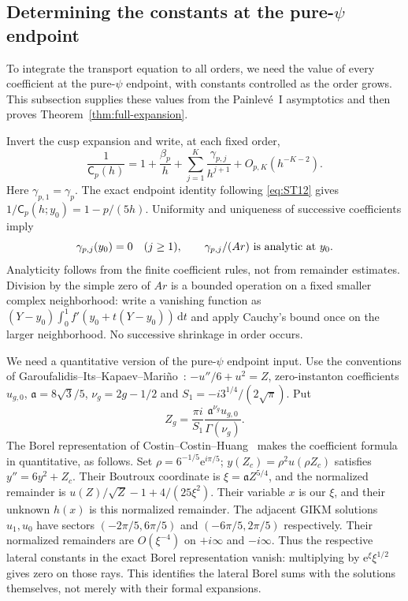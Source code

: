 \subsection{Determining the constants at the pure-\texorpdfstring{$\psi$}{psi} endpoint}\label{sec:endpoint-expansion}

To integrate the transport equation to all orders, we need the value of
every coefficient at the pure-$\psi$ endpoint, with constants controlled
as the order grows. This subsection supplies these values from the
Painlev\'e~I asymptotics and then proves Theorem~\ref{thm:full-expansion}.

Invert the cusp expansion and write, at each fixed order,
\begin{equation}
 \frac1{\mathsf C_p(h)}
 =1+\frac{\beta_p}h+\sum_{j=1}^K\frac{\gamma_{p,j}}{h^{j+1}}
      +O_{p,K}(h^{-K-2}).
 \label{eq:FE8}
\end{equation}
Here $\gamma_{p,1}=\gamma_p$. The exact endpoint identity following
\eqref{eq:ST12} gives $1/\mathsf C_p(h;y_0)=1-p/(5h)$.
Uniformity and uniqueness of successive coefficients imply
\begin{equation}
 \gamma_{p,j}(y_0)=0\quad(j\ge1),\qquad
 \gamma_{p,j}/(Ar)\ \hbox{is analytic at }y_0.
 \label{eq:FE9}
\end{equation}
Analyticity follows from the finite coefficient rules, not from remainder
estimates. Division by the simple zero of $Ar$ is a bounded operation
on a fixed smaller complex neighborhood: write a vanishing function
as $(Y-y_0)\int_0^1 f'(y_0+t(Y-y_0))\,\mathrm{d}t$ and apply Cauchy's bound
once on the larger neighborhood. No successive shrinkage in order occurs.

We need a quantitative version of the pure-$\psi$ endpoint input.
Use the conventions of Garoufalidis--Its--Kapaev--Mari\~no~\cite{GIKM}:
$-u''/6+u^2=Z$, zero-instanton coefficients $u_{g,0}$,
$\mathfrak a=8\sqrt3/5$, $\nu_g=2g-1/2$ and
$S_1=-i3^{1/4}/(2\sqrt\pi)$. Put
\[
 Z_g=\frac{\pi i}{S_1}
       \frac{\mathfrak a^{\nu_g}u_{g,0}}{\Gamma(\nu_g)}.
\]
The Borel representation of Costin--Costin--Huang~\cite[Theorem~2]{CCH}
makes the coefficient formula in \cite[Section~2.3]{GIKM} quantitative,
as follows. Set $\rho=6^{-1/5}\mathrm{e}^{i\pi/5}$;
$y(Z_c)=\rho^2u(\rho Z_c)$ satisfies $y''=6y^2+Z_c$.
Their Boutroux coordinate is $\xi=\mathfrak a Z^{5/4}$, and the
normalized remainder is $u(Z)/\sqrt Z-1+4/(25\xi^2)$. Their variable
$x$ is our $\xi$, and their unknown $h(x)$ is this normalized remainder.
The adjacent GIKM solutions $u_1,u_0$ have sectors
$(-2\pi/5,6\pi/5)$ and $(-6\pi/5,2\pi/5)$ respectively.
Their normalized remainders are $O(\xi^{-4})$ on $+i\infty$ and
$-i\infty$. Thus the respective lateral constants in the exact Borel
representation vanish: multiplying by $\mathrm{e}^\xi\xi^{1/2}$ gives zero
on those rays. This identifies the lateral Borel sums with the
solutions themselves, not merely with their formal expansions.

